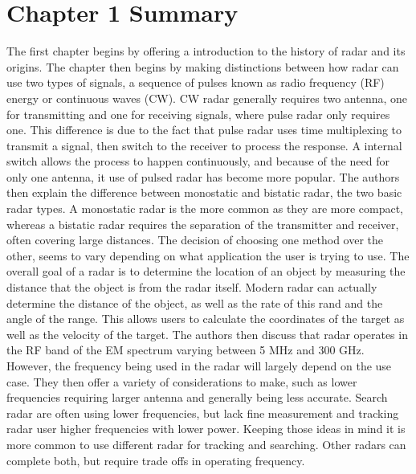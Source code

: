 \documentclass[12pt]{article}
\begin{document}
\section{Chapter 1 Summary}
The first chapter begins by offering a introduction to the history of radar and its origins. The chapter then begins by making distinctions between how radar can use two types of signals, a sequence of pulses known as radio frequency (RF) energy or continuous waves (CW). CW radar generally requires two antenna, one for transmitting and one for receiving signals, where pulse radar only requires one. This difference is due to the fact that pulse radar uses time multiplexing to transmit a signal, then switch to the receiver to process the response. A internal switch allows the process to happen continuously, and because of the need for only one antenna, it use of pulsed radar has become more popular. 
The authors then explain the difference between monostatic and bistatic radar, the two basic radar types. A monostatic radar is the more common as they are more compact, whereas a bistatic radar requires the separation of the transmitter and receiver, often covering large distances. The decision of choosing one method over the other, seems to vary depending on what application the user is trying to use. The overall goal of a radar is to determine the location of an object by measuring the distance that the object is from the radar itself. Modern radar can actually determine the distance of the object, as well as the rate of this rand and the angle of the range. This allows users to calculate the coordinates of the target as well as the velocity of the target. 
The authors then discuss that radar operates in the RF band of the EM spectrum varying between 5 MHz and 300 GHz. However, the frequency being used in the radar will largely depend on the use case. They then offer a variety of considerations to make, such as lower frequencies requiring larger antenna and generally being less accurate. Search radar are often using lower frequencies, but lack fine measurement and tracking radar user higher frequencies with lower power. Keeping those ideas in mind it is more common to use different radar for tracking and searching. Other radars can complete both, but require trade offs in operating frequency. 
\end{document}
